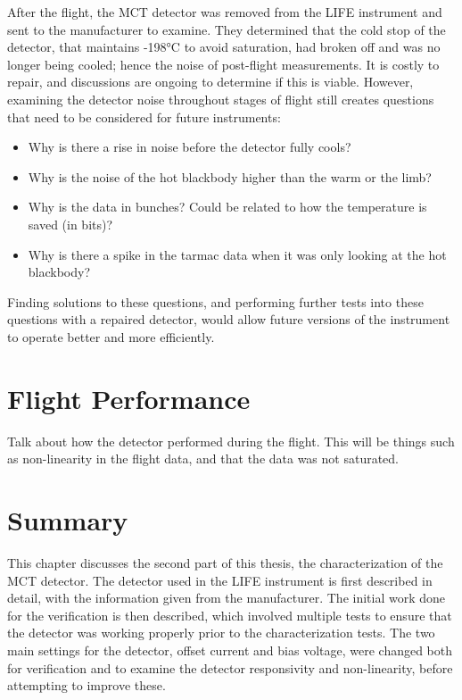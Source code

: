 After the flight, the MCT detector was removed from the LIFE instrument and sent to the manufacturer to examine. They determined that the cold stop of the detector, that maintains -198°C to avoid saturation, had broken off and was no longer being cooled; hence the noise of post-flight measurements. It is costly to repair, and discussions are ongoing to determine if this is viable. However, examining the detector noise throughout stages of flight still creates questions that need to be considered for future instruments:
\begin{itemize}
    \item Why is there a rise in noise before the detector fully cools?
    \item Why is the noise of the hot blackbody higher than the warm or the limb?
    \item Why is the data in bunches? Could be related to how the temperature is saved (in bits)?
    \item Why is there a spike in the tarmac data when it was only looking at the hot blackbody?
\end{itemize}
Finding solutions to these questions, and performing further tests into these questions with a repaired detector, would allow future versions of the instrument to operate better and more efficiently.

\section{Flight Performance}\label{detector_flight_performance}
Talk about how the detector performed during the flight. This will be things such as non-linearity in the flight data, and that the data was not saturated.

\section{Summary}
This chapter discusses the second part of this thesis, the characterization of the MCT detector. The detector used in the LIFE instrument is first described in detail, with the information given from the manufacturer. The initial work done for the verification is then described, which involved multiple tests to ensure that the detector was working properly prior to the characterization tests. The two main settings for the detector, offset current and bias voltage, were changed both for verification and to examine the detector responsivity and non-linearity, before attempting to improve these.

